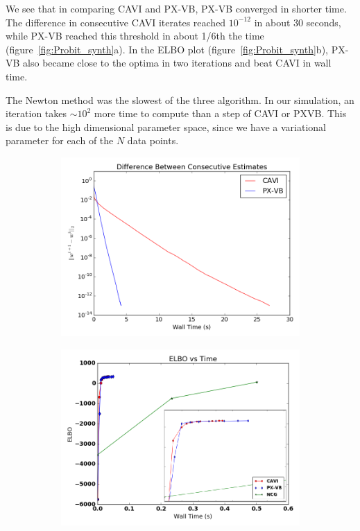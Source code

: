 \documentclass{article}
\begin{document}
We see that in comparing CAVI and PX-VB, PX-VB converged in shorter time. The difference in consecutive CAVI iterates reached $10^{-12}$ in about 30 seconds, while PX-VB reached this threshold in about 1/6th the time (figure~\ref{fig:Probit_synth}a). In the ELBO plot (figure~\ref{fig:Probit_synth}b), PX-VB also became close to the optima in two iterations and beat CAVI in wall time. 

The Newton method was the slowest of the three algorithm. In our simulation, an iteration takes $\sim10^2$ more time to compute than a step of CAVI or PXVB. This is due to the high dimensional parameter space, since we have a variational parameter for each of the $N$ data points. 


\begin{figure}[tb]
    \begin{subfigure}[t]{0.49\textwidth}
        \includegraphics[width=\textwidth]{Probit_synth/CAVI_PX_convergence.png}
        \subcaption{}
    \end{subfigure}
          \begin{subfigure}[t]{0.49\textwidth}
        \includegraphics[width=\textwidth]{Probit_synth/elbo_timeII.png}

\end{subfigure}
\end{figure}
\end{document}

